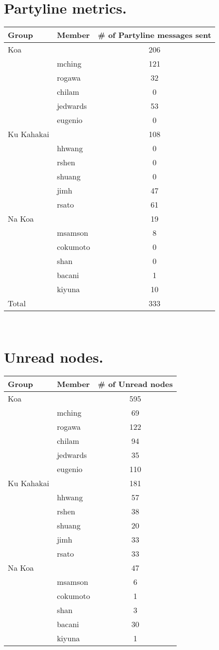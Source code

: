 \section{Partyline metrics.}
\begin{tabular}{|l|l|c|}
\hline
Group&Member&\# of Partyline messages sent\\
\hline
\hline
Koa&&206\\
\hline
&mching&121\\
&rogawa&32\\
&chilam&0\\
&jedwards&53\\
&eugenio&0\\
\hline
\hline
Ku Kahakai&&108\\
\hline
&hhwang&0\\
&rshen&0\\
&shuang&0\\
&jimh&47\\
&rsato&61\\
\hline
\hline
Na Koa&&19\\
\hline
&msamson&8\\
&cokumoto&0\\
&shan&0\\
&bacani&1\\
&kiyuna&10\\
\hline
\hline
Total&&333\\
\hline
\end{tabular} \\


\section{Unread nodes.}
\begin{tabular}{|l|l|c|}
\hline
Group&Member&\# of Unread nodes\\
\hline
\hline
Koa&&595\\
\hline
&mching&69\\
&rogawa&122\\
&chilam&94\\
&jedwards&35\\
&eugenio&110\\
\hline
\hline
Ku Kahakai&&181\\
\hline
&hhwang&57\\
&rshen&38\\
&shuang&20\\
&jimh&33\\
&rsato&33\\
\hline
\hline
Na Koa&&47\\
\hline
&msamson&6\\
&cokumoto&1\\
&shan&3\\
&bacani&30\\
&kiyuna&1\\
\hline
\end{tabular} \\




